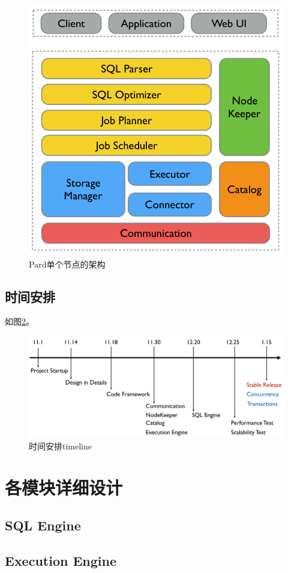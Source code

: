 \documentclass[a4paper, 12pt]{ctexart}
\begin{document}
\begin{figure}[htbp]
	\centering
	\includegraphics[width=0.7\linewidth]{figure/pard-node-in.png}
	\caption{Pard单个节点的架构}
	\label{fig:node1}
\end{figure}


\subsection{时间安排}
如图\ref{fig:tl}。

\begin{figure}[htbp]
	\centering
	\includegraphics[width=\linewidth]{figure/timeline.png}
	\caption{时间安排timeline}
	\label{fig:tl}
\end{figure}

\section{各模块详细设计}

\subsection{SQL Engine}
\subsection{Execution Engine}
\end{document}
